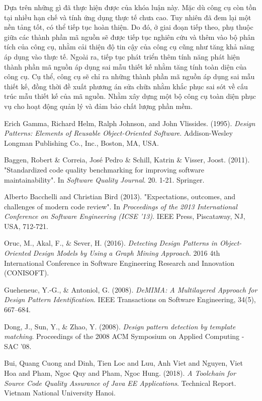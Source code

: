 \documentclass[12pt]{report}
\begin{document}
\noindent Dựa trên những gì đã thực hiện được của khóa luận này. Mặc dù công cụ còn tồn tại nhiều hạn chế và tính ứng dụng thực tế chưa cao. Tuy nhiên đã đem lại một nền tảng tốt, có thể tiếp tục hoàn thiện. Do đó, ở giai đoạn tiếp theo, phụ thuộc giữa các thành phần mã nguồn sẽ được tiếp tục nghiên cứu và thêm vào bộ phân tích của công cụ, nhằm cải thiện độ tin cậy của công cụ cũng như tăng khả năng áp dụng vào thực tế. Ngoài ra, tiếp tục phát triển thêm tính năng phát hiện thành phần mã nguồn áp dụng sai mẫu thiết kế nhằm tăng tính toàn diện của công cụ. Cụ thể, công cụ sẽ chỉ ra những thành phần mã nguồn áp dụng sai mẫu thiết kế, đồng thời đề xuất phương án sửa chữa nhằm khắc phục sai sót về cấu trúc mẫu thiết kế của mã nguồn. Nhằm xây dựng một bộ công cụ toàn diện phục vụ cho hoạt động quản lý và đảm bảo chất lượng phần mềm.
\begin{thebibliography}{9}
	Erich Gamma, Richard Helm, Ralph Johnson, and John Vlissides. (1995). \textit{Design Patterns: Elements of Reusable Object-Oriented Software}. Addison-Wesley Longman Publishing Co., Inc., Boston, MA, USA.
	
	Baggen, Robert \& Correia, José Pedro \& Schill, Katrin \& Visser, Joost. (2011). "Standardized code quality benchmarking for improving software maintainability". In \textit{Software Quality Journal}. 20. 1-21. Springer.
	
	Alberto Bacchelli and Christian Bird (2013). "Expectations, outcomes, and challenges of modern code review". In \textit{Proceedings of the 2013 International Conference on Software Engineering (ICSE '13)}. IEEE Press, Piscataway, NJ, USA, 712-721.
	
	Oruc, M., Akal, F., $\&$ Sever, H. (2016). \textit{Detecting Design Patterns in Object-Oriented Design Models by Using a Graph Mining Approach}. 2016 4th International Conference in Software Engineering Research and Innovation (CONISOFT).
	
	Gueheneuc, Y.-G., \& Antoniol, G. (2008). \textit{ DeMIMA: A Multilayered Approach for Design Pattern Identification}. IEEE Transactions on Software Engineering, 34(5), 667–684.
	
	Dong, J., Sun, Y., \& Zhao, Y. (2008). \textit{Design pattern detection by template matching}. Proceedings of the 2008 ACM Symposium on Applied Computing - SAC ’08.
	
	Bui, Quang Cuong and Dinh, Tien Loc and Luu, Anh Viet and Nguyen, Viet Hoa and Pham, Ngoc Quy and Pham, Ngoc Hung. (2018). \textit{ A Toolchain for Source Code Quality Assurance of Java EE Applications}. Technical Report. Vietnam National University Hanoi.
	


\end{thebibliography}
\end{document}
